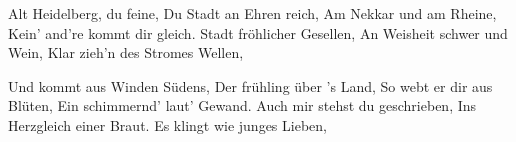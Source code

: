 \footnotemark [
ititle={Alt Heidelberg}]


\beginverse
Alt Heidelberg, du feine,
Du Stadt an Ehren reich,
Am Nekkar und am Rheine,
Kein' and're kommt dir gleich.
Stadt fröhlicher Gesellen,
An Weisheit schwer und Wein,
Klar zieh'n des Stromes Wellen,
\endverse

\beginverse
Und kommt aus Winden Südens,
Der frühling über 's Land,
So webt er dir aus Blüten,
Ein schimmernd' laut' Gewand.
Auch mir stehst du geschrieben,
Ins Herzgleich einer Braut.
Es klingt wie junges Lieben,
\endverse
\endsong